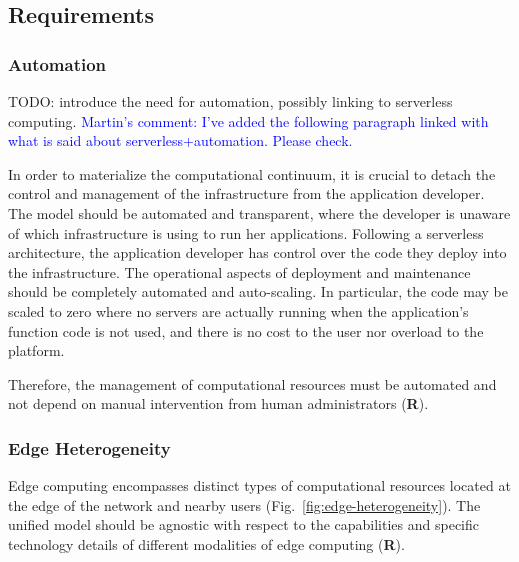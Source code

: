 \subsection{Requirements}\label{sec:requirements}


\subsubsection{Automation}


TODO: introduce the need for automation, possibly linking to serverless computing.
\textcolor{blue}{Martin's comment: I've added the following paragraph linked with what is said about serverless+automation. Please check.}

In order to materialize the computational continuum, it is crucial to detach the control and management of the infrastructure from the application developer. The model should be automated and transparent, where the developer is unaware of which infrastructure is using to run her applications. Following a serverless architecture, the application developer has control over the code they deploy into the infrastructure.  The operational aspects of deployment and maintenance should be completely automated and
auto-scaling. In particular, the code may be scaled to zero where no servers are actually running when the application's function code is not used, and there is no cost to the user nor overload to the platform.

Therefore, the management of computational resources must be automated and not depend on  manual intervention from human administrators (\textbf{R}).


\subsubsection{Edge Heterogeneity}


Edge computing encompasses distinct types of computational resources located at the edge of the network and nearby users (Fig.~\ref{fig:edge-heterogeneity}). The unified model should be agnostic with respect to the capabilities and specific technology details of different modalities of edge computing (\textbf{R}).

